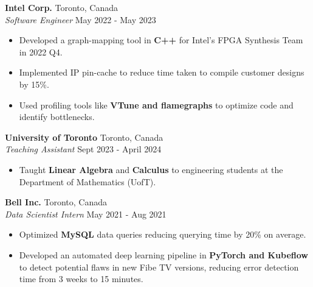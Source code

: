 \documentclass[a4paper]{article}
\begin{document}
\textbf{Intel Corp.} \hfill Toronto, Canada\\
\textit{Software Engineer} \hfill May 2022 - May 2023\\
\vspace{-2.5mm}
\begin{itemize} \itemsep 1pt
	\item Developed a graph-mapping tool in \textbf{C++} for Intel's FPGA Synthesis Team in 2022 Q4.
	\vspace{-1.5mm}
	\item Implemented IP pin-cache to reduce time taken to compile customer designs by 15\%.
	\vspace{-1.5mm}
	\item Used profiling tools like \textbf{VTune and flamegraphs} to optimize code and identify bottlenecks. 
	\vspace{-1.5mm}
\end{itemize}


\textbf{University of Toronto} \hfill Toronto, Canada\\
\textit{Teaching Assistant} \hfill Sept 2023 - April 2024\\
\vspace{-2.5mm}
\begin{itemize} \itemsep 0.5pt
	\item Taught \textbf{Linear Algebra} and \textbf{Calculus} to engineering students at the Department of Mathematics (UofT).
    \vspace{-2mm}
\end{itemize}

\textbf{Bell Inc.} \hfill Toronto, Canada\\
\textit{Data Scientist Intern} \hfill May 2021 - Aug 2021\\
\vspace{-2.5mm}
\begin{itemize} \itemsep 1pt
	\item Optimized \textbf{MySQL} data queries reducing querying time by 20\% on average.
	\vspace{-1.5mm}
	\item Developed an automated deep learning pipeline in \textbf{PyTorch and Kubeflow} to detect potential flaws in new Fibe TV versions, reducing error detection time from 3 weeks to 15 minutes.
    \vspace{-1.5mm}
\end{itemize}
\end{document}
